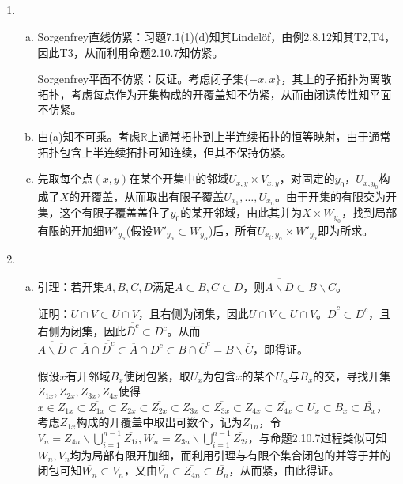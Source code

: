 \documentclass[a4paper,UTF8,fontset=windows]{ctexart}
\begin{document}
\subsection{}
\begin{enumerate}[(1)]
    \item
    \begin{enumerate}[(a)]
    \item
    Sorgenfrey直线仿紧：习题7.1(1)(d)知其Lindel\"of，由例2.8.12知其T2,T4，因此T3，从而利用命题2.10.7知仿紧。
    
    Sorgenfrey平面不仿紧：反证。考虑闭子集$\{-x,x\}$，其上的子拓扑为离散拓扑，考虑每点作为开集构成的开覆盖知不仿紧，从而由闭遗传性知平面不仿紧。
    
    \item
    由(a)知不可乘。考虑$\mathbb{R}$上通常拓扑到上半连续拓扑的恒等映射，由于通常拓扑包含上半连续拓扑可知连续，但其不保持仿紧。
    
    \item
    先取每个点$(x,y)$在某个开集中的邻域$U_{x,y}\times V_{x,y}$，对固定的$y_0$，$U_{x,y_0}$构成了$X$的开覆盖，从而取出有限子覆盖$U_{x_1},\dots,U_{x_n}$。由于开集的有限交为开集，这个有限子覆盖盖住了$y_0$的某开邻域，由此其并为$X\times W_{y_0}$，找到局部有限的开加细$W'_{y_\alpha}$(假设$W'_{y_\alpha}\subset W_{y_\alpha}$)后，所有$U_{x_i,y_\alpha}\times W'_{y_\alpha}$即为所求。
    \end{enumerate}
    
    \item
    \begin{enumerate}[(a)]
    \item
    引理：若开集$A,B,C,D$满足$\overline{A}\subset B,\overline{C}\subset D$，则$\overline{A\backslash\overline{D}}\subset B\backslash\overline{C}$。
    
    证明：$U\cap V\subset\overline{U}\cap\overline{V}$，且右侧为闭集，因此$\overline{U\cap V}\subset\overline{U}\cap\overline{V}$。$\overline{D}^c\subset D^c$，且右侧为闭集，因此$\overline{\overline{D}^c}\subset D^c$。从而$\overline{A\backslash\overline{D}}\subset\overline{A}\cap\overline{\overline{D}^c}\subset\overline{A}\cap D^c\subset B\cap\overline{C}^c =B\backslash\overline{C}$，即得证。
    
    假设$x$有开邻域$B_x$使闭包紧，取$U_x$为包含$x$的某个$U_\alpha$与$B_x$的交，寻找开集$Z_{1x},Z_{2x},Z_{3x},Z_{4x}$使得$x\in Z_{1x}\subset\overline{Z_{1x}}\subset Z_{2x}\subset\overline{Z_{2x}}\subset Z_{3x}\subset\overline{Z_{3x}}\subset Z_{4x}\subset\overline{Z_{4x}}\subset U_x\subset B_x\subset\overline{B_x}$，考虑$Z_{1x}$构成的开覆盖中取出可数个，记为$Z_{1n}$，令$V_n=Z_{4n}\backslash\bigcup_{i=1}^{n-1}\overline{Z_{1i}},W_n=Z_{3n}\backslash\bigcup_{i=1}^{n-1}\overline{Z_{2i}}$，与命题2.10.7过程类似可知$W_n,V_n$均为局部有限开加细，而利用引理与有限个集合闭包的并等于并的闭包可知$\overline{W_n}\subset V_n$，又由$\overline{V_n}\subset\overline{Z_{4n}}\subset\overline{B_n}$，从而紧，由此得证。
    

\end{enumerate}
\end{enumerate}
\end{document}
